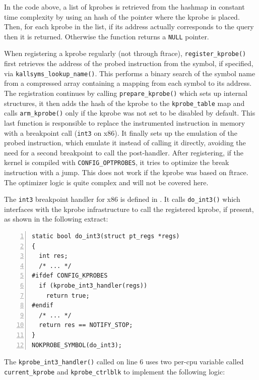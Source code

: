 In the code above, a list of kprobes is retrieved from the hashmap in constant
time complexity by using an hash of the pointer where the kprobe is placed.
Then, for each kprobe in the list, if its address actually corresponds to the
query then it is returned. Otherwise the function returns a \verb|NULL| pointer.

When registering a kprobe regularly (not through ftrace),
\verb|register_kprobe()| first retrieves the address of the probed instruction
from the symbol, if specified, via \verb|kallsyms_lookup_name()|. This performs
a binary search of the symbol name from a compressed array containing a mapping
from each symbol to its address. The registration continues by calling
\verb|prepare_kprobe()| which sets up internal structures, it then adds the hash
of the kprobe to the \verb|kprobe_table| map and calls \verb|arm_kprobe()| only
if the kprobe was not set to be disabled by default. This last function is
responsible to replace the instrumented instruction in memory with a breakpoint
call (\verb|int3| on x86). It finally sets up the emulation of the probed
instruction, which emulate it instead of calling it directly, avoiding the need
for a second breakpoint to call the post-handler. After registering, if the
kernel is compiled with \verb|CONFIG_OPTPROBES|, it tries to optimize the break
instruction with a jump. This does not work if the kprobe was based on ftrace.
The optimizer logic is quite complex and will not be covered here.

The \verb|int3| breakpoint handler for x86 is defined in
. It calls \verb|do_int3()| which
interfaces with the kprobe infrastructure to call the registered kprobe, if
present, as shown in the following extract:

\begin{Verbatim}[numbers=left, numbersep=5pt, frame=single]
static bool do_int3(struct pt_regs *regs)
{
  int res;
  /* ... */
#ifdef CONFIG_KPROBES
  if (kprobe_int3_handler(regs))
    return true;
#endif
  /* ... */
  return res == NOTIFY_STOP;
}
NOKPROBE_SYMBOL(do_int3);
\end{Verbatim}

The \verb|kprobe_int3_handler()| called on line 6 uses two per-cpu variable
called \verb|current_kprobe| and \verb|kprobe_ctrlblk| to implement the
following logic:

